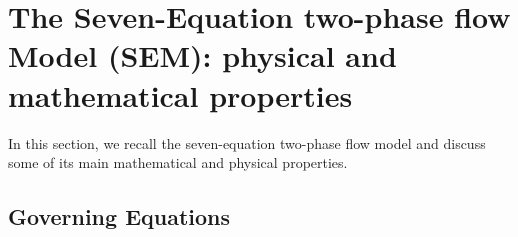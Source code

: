 \section{The Seven-Equation two-phase flow Model (SEM): physical and mathematical properties}\label{sec:7-equ-model}
%
In this section, we recall the seven-equation two-phase flow model and discuss some of its main mathematical and physical properties.
%
\subsection{Governing Equations}


